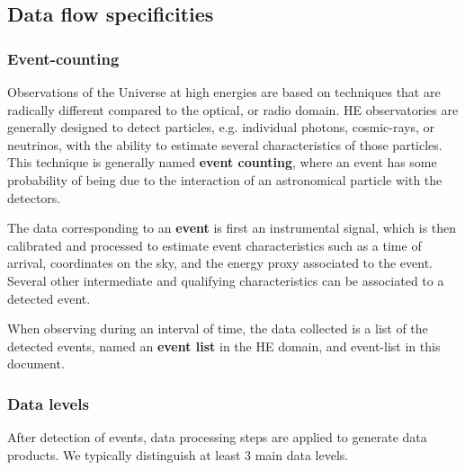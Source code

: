 \documentclass[11pt,a4paper]{ivoa}
\begin{document}
\subsection{Data flow specificities}

\subsubsection{Event-counting}

Observations of the Universe at high energies are based on techniques that are radically different compared to the optical, or radio domain. HE observatories are generally designed to detect particles, e.g. individual photons, cosmic-rays, or neutrinos, with the ability to estimate several characteristics of those particles. This technique is generally named \textbf{event counting}, where an event has some probability of being due to the interaction of an astronomical particle with the detectors.

The data corresponding to an \textbf{event} is first an instrumental signal, which is then calibrated and processed to estimate event characteristics such as a time of arrival, coordinates on the sky, and the energy proxy associated to the event. Several other intermediate and qualifying characteristics can be associated to a detected event.

When observing during an interval of time, the data collected is a list of the detected events, named an \textbf{event list} in the HE domain, and event-list in this document.




\subsubsection{Data levels}

After detection of events, data processing steps are applied to generate data products. We typically distinguish at least 3 main data levels. 
\end{document}

